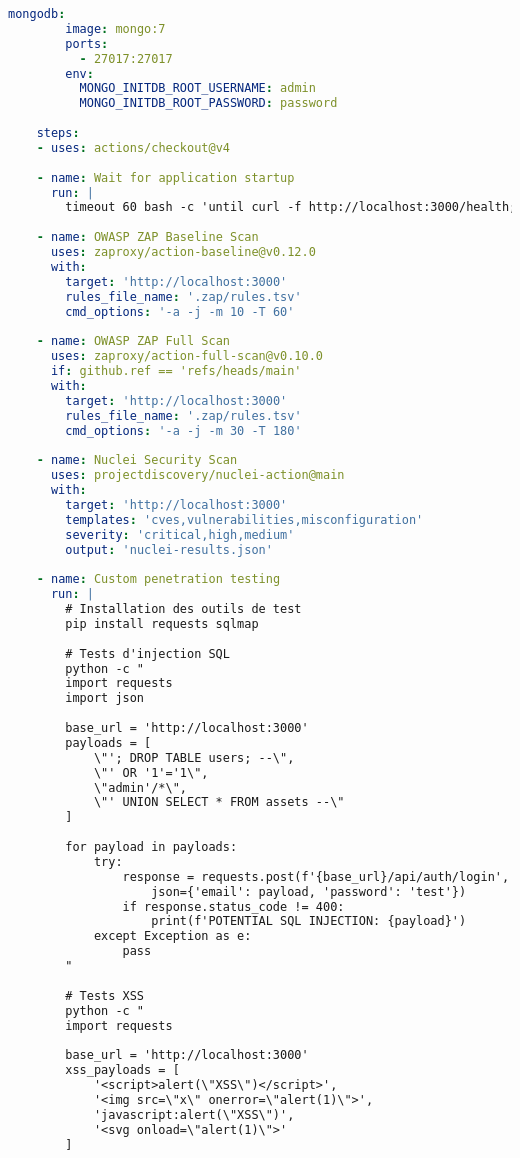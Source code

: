 \documentclass[12pt,a4paper]{report}
\begin{document}
\begin{lstlisting}[language=YAML, caption=Pipeline GitHub Actions DevSecOps complète]
      mongodb:
        image: mongo:7
        ports:
          - 27017:27017
        env:
          MONGO_INITDB_ROOT_USERNAME: admin
          MONGO_INITDB_ROOT_PASSWORD: password
    
    steps:
    - uses: actions/checkout@v4
    
    - name: Wait for application startup
      run: |
        timeout 60 bash -c 'until curl -f http://localhost:3000/health; do sleep 2; done'
    
    - name: OWASP ZAP Baseline Scan
      uses: zaproxy/action-baseline@v0.12.0
      with:
        target: 'http://localhost:3000'
        rules_file_name: '.zap/rules.tsv'
        cmd_options: '-a -j -m 10 -T 60'
    
    - name: OWASP ZAP Full Scan
      uses: zaproxy/action-full-scan@v0.10.0
      if: github.ref == 'refs/heads/main'
      with:
        target: 'http://localhost:3000'
        rules_file_name: '.zap/rules.tsv'
        cmd_options: '-a -j -m 30 -T 180'
    
    - name: Nuclei Security Scan
      uses: projectdiscovery/nuclei-action@main
      with:
        target: 'http://localhost:3000'
        templates: 'cves,vulnerabilities,misconfiguration'
        severity: 'critical,high,medium'
        output: 'nuclei-results.json'
    
    - name: Custom penetration testing
      run: |
        # Installation des outils de test
        pip install requests sqlmap
        
        # Tests d'injection SQL
        python -c "
        import requests
        import json
        
        base_url = 'http://localhost:3000'
        payloads = [
            \"'; DROP TABLE users; --\",
            \"' OR '1'='1\",
            \"admin'/*\",
            \"' UNION SELECT * FROM assets --\"
        ]
        
        for payload in payloads:
            try:
                response = requests.post(f'{base_url}/api/auth/login', 
                    json={'email': payload, 'password': 'test'})
                if response.status_code != 400:
                    print(f'POTENTIAL SQL INJECTION: {payload}')
            except Exception as e:
                pass
        "
        
        # Tests XSS
        python -c "
        import requests
        
        base_url = 'http://localhost:3000'
        xss_payloads = [
            '<script>alert(\"XSS\")</script>',
            '<img src=\"x\" onerror=\"alert(1)\">',
            'javascript:alert(\"XSS\")',
            '<svg onload=\"alert(1)\">'
        ]
        

\end{lstlisting}
\end{document}
